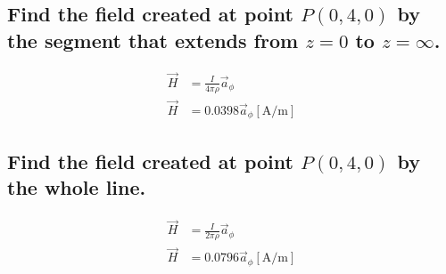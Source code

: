 \documentclass[14pt]{extarticle}
\begin{document}
\boldmath
\subsection{Find the field created at point $P(0,4,0)$ by the segment
	that extends from $z=0$ to $z=\infty$.}
\unboldmath

\begin{align*}
	\vec{H} & =\frac{I}{4\pi\rho}\vec{a}_\phi   \\
	\vec{H} & =0.0398\vec{a}_\phi\mathrm{[A/m]}
\end{align*}

\boldmath
\subsection{Find the field created at point $P(0,4,0)$ by the whole line.}
\unboldmath

\begin{align*}
	\vec{H} & =\frac{I}{2\pi\rho}\vec{a}_\phi   \\
	\vec{H} & =0.0796\vec{a}_\phi\mathrm{[A/m]}
\end{align*}
\end{document}

